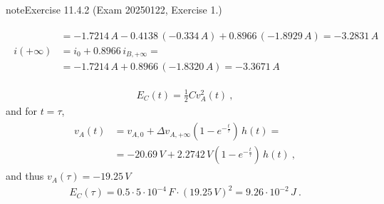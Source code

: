 \documentclass[letterpaper,10pt,english]{jupyterBook}
\begin{document}
\begin{sphinxadmonition}{note}{Exercise 11.4.2 (Exam 2025\sphinxhyphen{}01\sphinxhyphen{}22, Exercise 1.)}
\begin{itemize}
\begin{equation*}
\begin{split}
\begin{aligned}
                & = -1.7214 \, A - 0.4138 \, (-0.334 \, A) + 0.8966 \, (-1.8929 \, A) = -3.2831 \, A \\
     i(+\infty) & = i_{0} + 0.8966 \, i_{B,+\infty} = \\ 
                & = -1.7214 \, A + 0.8966 \, (-1.8320 \, A) = - 3.3671 \, A 
   \end{aligned}\end{split}
\end{equation*}
\end{itemize}



\sphinxAtStartPar
{}
\begin{equation*}
\begin{split}E_C(t) = \frac{1}{2} C v_A^2(t) \ ,\end{split}
\end{equation*}
\sphinxAtStartPar
and for \(t = \tau\),
\begin{equation*}
\begin{split}\begin{aligned}
  v_A(t)
  & = v_{A,0} + \Delta v_{A,+\infty} \left( 1 - e^{-\frac{t}{\tau}} \right) \, h(t) = \\
  & = -20.69 \, V + 2.2742 \, V \left( 1 - e^{-\frac{t}{\tau}} \right) \, h(t) \ ,
\end{aligned}\end{split}
\end{equation*}
\sphinxAtStartPar
and thus \(v_A(\tau) = -19.25 \, V\)
\begin{equation*}
\begin{split}E_C(\tau) = 0.5 \cdot 5 \cdot 10^{-4} \, F \cdot ( 19.25 \, V )^2 = 9.26 \cdot 10^{-2} \, J \ .\end{split}
\end{equation*}\end{sphinxadmonition}
 \label{exercise:exam-24-09-06-exe-01}
\end{document}
